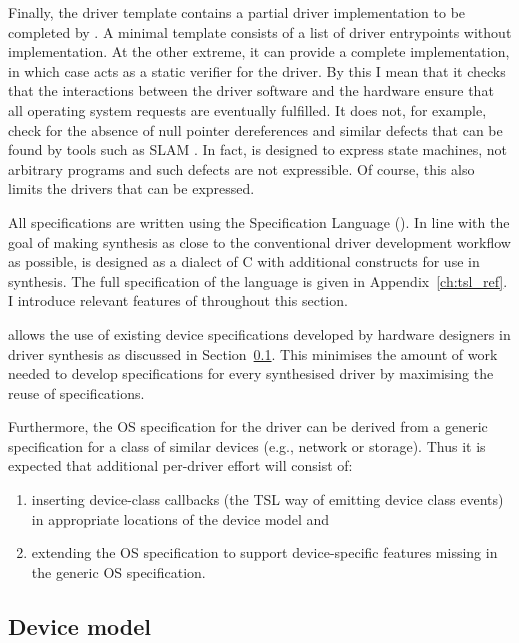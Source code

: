 Finally, the driver template contains a partial driver implementation to be completed by \termite.  A minimal template consists of a list of driver entrypoints without implementation.  At the other extreme, it can provide a complete implementation, in which case \termite acts as a static verifier for the driver. By this I mean that it checks that the interactions between the driver software and the hardware ensure that all operating system requests are eventually fulfilled. It does not, for example, check for the absence of null pointer dereferences and similar defects that can be found by tools such as SLAM \cite{Ball_BKL_10}. In fact, \tsl is designed to express state machines, not arbitrary programs and such defects are not expressible. Of course, this also limits the drivers that can be expressed.

All specifications are written using the \termite Specification Language (\tsl).  In line with the goal of making synthesis as close to the conventional driver development workflow as possible, \tsl is designed as a dialect of C with additional constructs for use in synthesis.  The full specification of the \tsl language is given in Appendix~\ref{ch:tsl_ref}. I introduce relevant features of \tsl throughout this section.

\termite allows the use of existing device specifications developed by hardware designers in driver synthesis as discussed in Section~\ref{sec:device_model}. This minimises the amount of work needed to develop specifications for every synthesised driver by maximising the reuse of specifications.  

Furthermore, the OS specification for the driver can be derived from a generic specification for a class of similar devices (e.g., network or storage).  Thus it is expected that additional per-driver effort will consist of: 
\begin{enumerate}
    \item inserting device-class callbacks (the TSL way of emitting device class events) in appropriate locations of the device model and 
    \item extending the OS specification to support device-specific features missing in the  generic OS specification.
\end{enumerate}

\subsection{Device model}
\label{sec:device_model}

